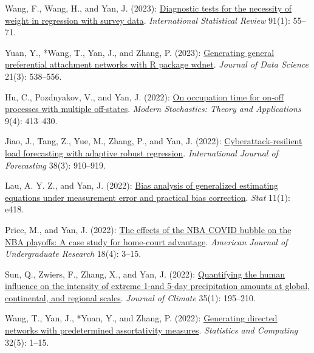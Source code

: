 \begin{RefereedJournalArticles}
\item Wang, F., Wang, H., and Yan, J. (2023):
\href{https://doi.org/10.1111/insr.12509}{Diagnostic tests for the
necessity of weight in regression with survey data}. \emph{International
Statistical Review} 91(1): 55--71.

\item *Yuan, Y., *Wang, T., Yan, J., and Zhang, P.
(2023): \href{https://doi.org/10.6339/23-JDS1110}{Generating general
preferential attachment networks with R package wdnet}. \emph{Journal of
Data Science} 21(3): 538--556.

\item *Hu, C., Pozdnyakov, V., and Yan, J. (2022):
\href{https://doi.org/10.15559/22-VMSTA210}{On occupation time for
on-off processes with multiple off-states}. \emph{Modern Stochastics:
Theory and Applications} 9(4): 413--430.

\item *Jiao, J., Tang, Z., Yue, M., Zhang, P., and Yan, J. (2022):
\href{https://doi.org/10.1016/j.ijforecast.2021.06.009}{Cyberattack-resilient
load forecasting with adaptive robust regression}. \emph{International
Journal of Forecasting} 38(3): 910--919.

\item *Lau, A. Y. Z., and Yan, J. (2022):
\href{https://doi.org/10.1002/sta4.418}{Bias analysis of generalized
estimating equations under measurement error and practical bias
correction}. \emph{Stat} 11(1): e418.

\item *Price, M., and Yan, J. (2022):
\href{https://doi.org/10.33697/ajur.2022.051}{The effects of the NBA
COVID bubble on the NBA playoffs: A case study for home-court
advantage}. \emph{American Journal of Undergraduate Research} 18(4):
3--15.

\item Sun, Q., Zwiers, F., Zhang, X., and Yan, J. (2022):
\href{https://doi.org/10.1175/JCLI-D-21-0028.1}{Quantifying the human
influence on the intensity of extreme 1-and 5-day precipitation amounts
at global, continental, and regional scales}. \emph{Journal of Climate}
35(1): 195--210.

\item *Wang, T., Yan, J., *Yuan, Y., and Zhang, P.
(2022): \href{https://doi.org/10.1007/s11222-022-10161-8}{Generating
directed networks with predetermined assortativity measures}.
\emph{Statistics and Computing} 32(5): 1--15.


\end{RefereedJournalArticles}
